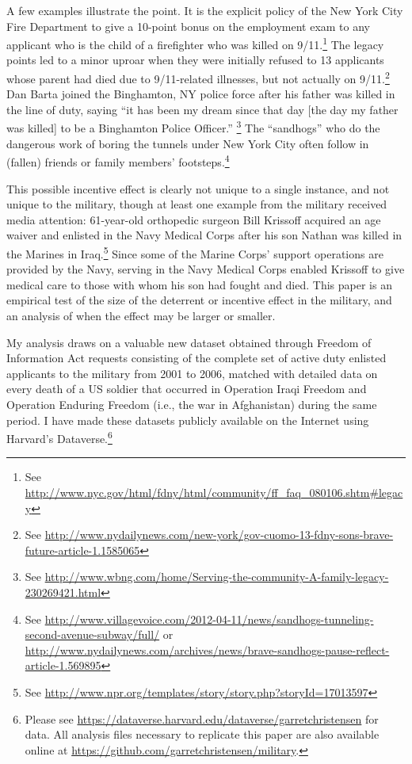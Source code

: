 \documentclass[12pt] {article}
\begin{document}
A few examples illustrate the point.  It is the explicit policy of the New York City Fire Department to give a 10-point bonus on the employment exam to any applicant who is the child of a firefighter who was killed on 9/11.\footnote {See \url{http://www.nyc.gov/html/fdny/html/community/ff_faq_080106.shtm\#legacy}} The legacy points led to a minor uproar when they were initially refused to 13 applicants whose parent had died due to 9/11-related illnesses, but not actually on 9/11.\footnote{See \url{http://www.nydailynews.com/new-york/gov-cuomo-13-fdny-sons-brave-future-article-1.1585065}} Dan Barta joined the Binghamton, NY police force after his father was killed in the line of duty, saying ``it has been my dream since that day [the day my father was killed] to be a Binghamton Police Officer.'' 
\footnote{See \url{http://www.wbng.com/home/Serving-the-community-A-family-legacy-230269421.html}} The ``sandhogs'' who do the dangerous work of boring the tunnels under New York City often follow in (fallen) friends or family members' footsteps.\footnote{See \url{http://www.villagevoice.com/2012-04-11/news/sandhogs-tunneling-second-avenue-subway/full/} or \url{http://www.nydailynews.com/archives/news/brave-sandhogs-pause-reflect-article-1.569895}} 

This possible incentive effect is clearly not unique to a single instance, and not unique to the military, though at least one example from the military received media attention: 61-year-old orthopedic surgeon Bill Krissoff acquired an age waiver and enlisted in the Navy Medical Corps after his son Nathan was killed in the Marines in Iraq.\footnote{See \url{http://www.npr.org/templates/story/story.php?storyId=17013597}}
Since some of the Marine Corps' support operations are provided by the Navy, serving in the Navy Medical Corps enabled Krissoff to give medical care to those with whom his son had fought and died.  This paper is an empirical test of the size of the deterrent or incentive effect in the military, and an analysis of when the effect may be larger or smaller. 


My analysis draws on a valuable new dataset obtained through Freedom of Information Act requests consisting of the complete set of active duty enlisted applicants to the military from 2001 to 2006, matched with detailed data on every death of a US soldier that occurred in Operation Iraqi Freedom and Operation
Enduring Freedom (i.e., the war in Afghanistan) during the same period. I have made these datasets publicly available on the Internet using Harvard's Dataverse.\footnote{Please see \url{https://dataverse.harvard.edu/dataverse/garretchristensen} for data. All analysis files necessary to replicate this paper are also available online at \url{https://github.com/garretchristensen/military}.}
\end{document}
